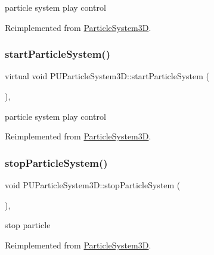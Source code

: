 particle system play control 

Reimplemented from \hyperlink{classParticleSystem3D_aecd79152c049fc63e5ea464589765e5b}{Particle\+System3D}.

\mbox{\label{classPUParticleSystem3D_ab59c7cf4ca02cb3cac7f9d49d46312f1}} 
\subsubsection{\texorpdfstring{start\+Particle\+System()}{startParticleSystem()}\hspace{0.1cm}{\footnotesize\ttfamily [2/2]}}
{\footnotesize\ttfamily virtual void P\+U\+Particle\+System3\+D\+::start\+Particle\+System (\begin{DoxyParamCaption}{ }\end{DoxyParamCaption})\hspace{0.3cm}{\ttfamily [override]}, {\ttfamily [virtual]}}

particle system play control 

Reimplemented from \hyperlink{classParticleSystem3D_aecd79152c049fc63e5ea464589765e5b}{Particle\+System3D}.

\mbox{\label{classPUParticleSystem3D_a2fb2d3bfd5bc6b7b827e1800f34f0157}} 
\subsubsection{\texorpdfstring{stop\+Particle\+System()}{stopParticleSystem()}\hspace{0.1cm}{\footnotesize\ttfamily [1/2]}}
{\footnotesize\ttfamily void P\+U\+Particle\+System3\+D\+::stop\+Particle\+System (\begin{DoxyParamCaption}{ }\end{DoxyParamCaption})\hspace{0.3cm}{\ttfamily [override]}, {\ttfamily [virtual]}}

stop particle 

Reimplemented from \hyperlink{classParticleSystem3D_a45c003e1eb2fc4d38ab74fd6231a7c47}{Particle\+System3D}.

